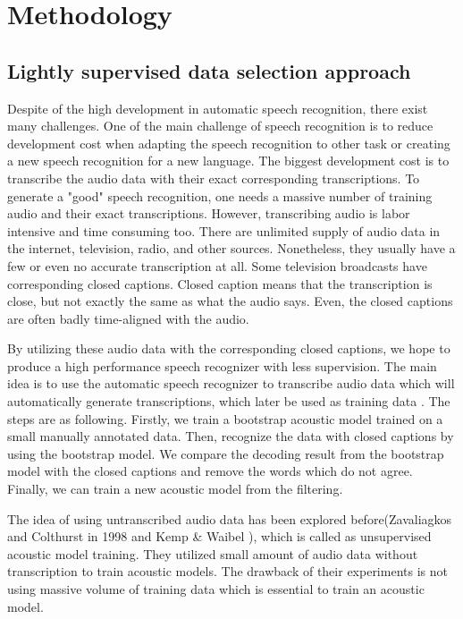 \chapter{Methodology}

\section{Lightly supervised data selection approach}
Despite of the high development in automatic speech recognition, there exist many challenges. One of the main challenge of speech recognition is to reduce development cost when adapting the speech recognition to other task or creating a new speech recognition for a new language. The biggest development cost is to transcribe the audio data with their exact corresponding transcriptions. To generate a "good" speech recognition, one needs a massive number of training audio and their exact transcriptions. However, transcribing audio is labor intensive and time consuming too. There are unlimited supply of audio data in the internet, television, radio, and other sources. Nonetheless, they usually have a few or even no accurate transcription at all.  Some television broadcasts have corresponding closed captions.  Closed caption means that the transcription is close, but not exactly the same as what the audio says. Even, the closed captions are often badly time-aligned with the audio.

By utilizing these audio data with the corresponding closed captions, we hope to produce a high performance speech recognizer with less supervision. The main idea is to use the automatic speech recognizer to transcribe audio data which will automatically generate transcriptions, which later be used as training data \cite{lightlySupervised}. The steps are as following. Firstly, we train a bootstrap acoustic model trained on a small manually annotated data. Then, recognize the data with closed captions by using the bootstrap model. We compare the decoding result from the bootstrap model with the closed captions and remove the words which do not agree. Finally, we can train a new acoustic model from the filtering.

The idea of using untranscribed audio data has been explored before(Zavaliagkos and Colthurst in 1998 \cite{Zavaliagkos1998UtilizingUT} and Kemp \& Waibel \cite{Kemp_unsupervisedtraining}), which is called as unsupervised acoustic model training. They utilized small amount of audio data without transcription to train acoustic models. The drawback of their experiments is not using massive volume of training data which is essential to train an acoustic model.

